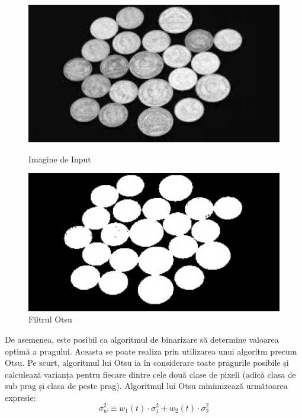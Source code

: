 \documentclass[a4paper,12pt]{report}
\begin{document}
\begin{figure}[h!]
    \centering
    \begin{minipage}{0.45\textwidth}
        \centering
        \includegraphics[width=1\textwidth]{images/input_binary_thresholding.jpg}
        \caption{Imagine de Input}
    \end{minipage}
    \hspace{0.01\textwidth}
    \begin{minipage}{0.45\textwidth}
        \centering
        \includegraphics[width=1\textwidth]{images/output_binary_thresholding.jpg}
        \caption{Filtrul Otsu}
    \end{minipage}
\end{figure}
\FloatBarrier

De asemenea, este posibil ca algoritmul de binarizare să determine valoarea optimă a pragului. Aceasta se poate realiza prin utilizarea unui algoritm precum Otsu. Pe scurt, algoritmul lui Otsu ia în considerare toate pragurile posibile și calculează varianța pentru fiecare dintre cele două clase de pixeli (adică clasa de sub prag și clasa de peste prag). Algoritmul lui Otsu minimizează următoarea expresie:
\[
    \sigma_w^2 \equiv w_1(t) \cdot \sigma_1^2 + w_2(t) \cdot \sigma_2^2
\]
\end{document}
